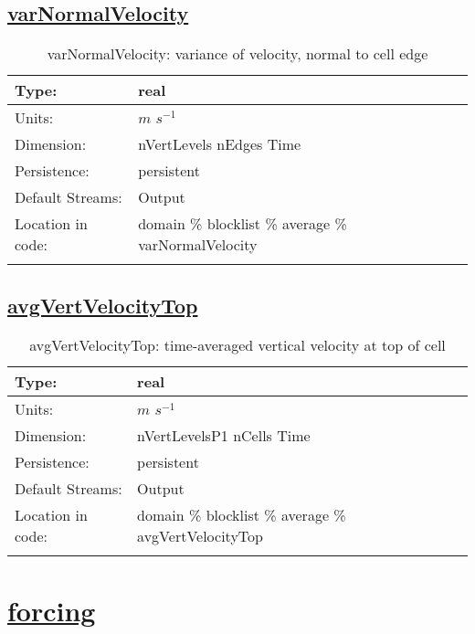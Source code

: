 \subsection[varNormalVelocity]{\hyperref[sec:var_tab_average]{varNormalVelocity}}
\label{subsec:var_sec_average_varNormalVelocity}
\begin{center}
\begin{longtable}{| p{2.0in} | p{4.0in} |}
        \hline 
        Type: & real \\
        \hline 
        Units: & $m$ $s^{-1}$ \\
        \hline 
        Dimension: & nVertLevels nEdges Time \\
        \hline 
        Persistence: & persistent \\
        \hline 
		 Default Streams: & Output  \\
        \hline 
		 Location in code: & domain \% blocklist \% average \% varNormalVelocity \\
		 \hline 
    \caption{varNormalVelocity: variance of velocity, normal to cell edge}
\end{longtable}
\end{center}
\subsection[avgVertVelocityTop]{\hyperref[sec:var_tab_average]{avgVertVelocityTop}}
\label{subsec:var_sec_average_avgVertVelocityTop}
\begin{center}
\begin{longtable}{| p{2.0in} | p{4.0in} |}
        \hline 
        Type: & real \\
        \hline 
        Units: & $m$ $s^{-1}$ \\
        \hline 
        Dimension: & nVertLevelsP1 nCells Time \\
        \hline 
        Persistence: & persistent \\
        \hline 
		 Default Streams: & Output  \\
        \hline 
		 Location in code: & domain \% blocklist \% average \% avgVertVelocityTop \\
		 \hline 
    \caption{avgVertVelocityTop: time-averaged vertical velocity at top of cell}
\end{longtable}
\end{center}
\section[forcing]{\hyperref[sec:var_tab_forcing]{forcing}}
\label{sec:var_sec_forcing}
